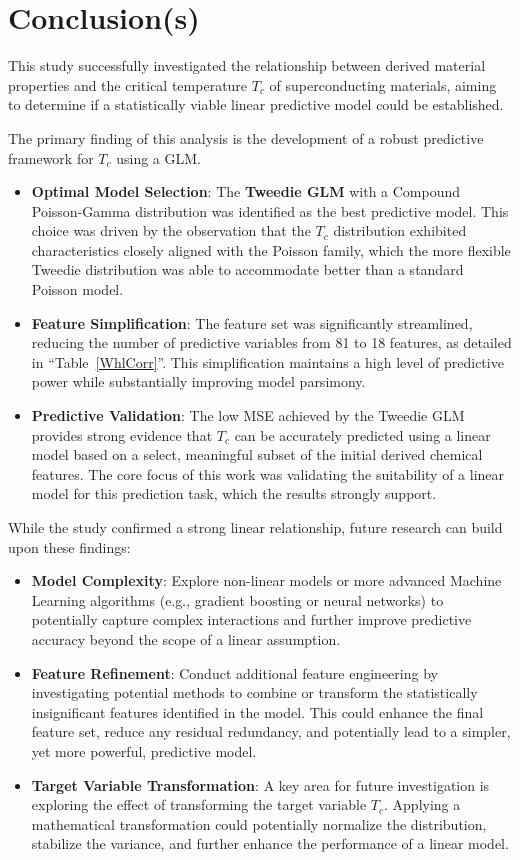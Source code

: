 \documentclass[conference]{IEEEtran}
\begin{document}
\section{\textbf{Conclusion(s)}}

This study successfully investigated the relationship between derived material properties and the critical temperature $T_c$ of superconducting materials, aiming to determine if a statistically viable linear predictive model could be established.

The primary finding of this analysis is the development of a robust predictive framework for $T_c$ using a GLM.
\begin{itemize}
	\item \textbf{Optimal Model Selection}: The \textbf{Tweedie GLM} with a Compound Poisson-Gamma distribution was identified as the best predictive model. This choice was driven by the observation that the $T_c$ distribution exhibited characteristics closely aligned with the Poisson family, which the more flexible Tweedie distribution was able to accommodate better than a standard Poisson model.
	\item \textbf{Feature Simplification}: The feature set was significantly streamlined, reducing the number of predictive variables from 81 to 18 features, as detailed in ``Table~\ref{WhlCorr}''. This simplification maintains a high level of predictive power while substantially improving model parsimony.
	\item \textbf{Predictive Validation}: The low MSE achieved by the Tweedie GLM provides strong evidence that $T_c$ can be accurately predicted using a linear model based on a select, meaningful subset of the initial derived chemical features. The core focus of this work was validating the suitability of a linear model for this prediction task, which the results strongly support.\\
\end{itemize}

While the study confirmed a strong linear relationship, future research can build upon these findings:
\begin{itemize}
	\item \textbf{Model Complexity}: Explore non-linear models or more advanced Machine Learning algorithms (e.g., gradient boosting or neural networks) to potentially capture complex interactions and further improve predictive accuracy beyond the scope of a linear assumption.
	\item \textbf{Feature Refinement}: Conduct additional feature engineering by investigating potential methods to combine or transform the statistically insignificant features identified in the model. This could enhance the final feature set, reduce any residual redundancy, and potentially lead to a simpler, yet more powerful, predictive model.
	\item \textbf{Target Variable Transformation}: A key area for future investigation is exploring the effect of transforming the target variable $T_c$. Applying a mathematical transformation could potentially normalize the distribution, stabilize the variance, and further enhance the performance of a linear model.
\end{itemize}
\end{document}
